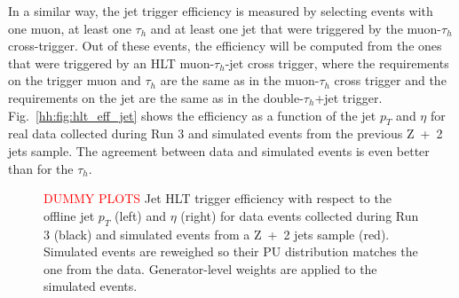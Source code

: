 \documentclass[../main.tex]{subfiles}
\begin{document}
In a similar way, the jet trigger efficiency is measured by selecting events with one muon, at least one $\tau_h$ and at least one jet that were triggered by the muon-$\tau_h$ cross-trigger. Out of these events, the efficiency will be computed from the ones that were triggered by an HLT muon-$\tau_h$-jet cross trigger, where the requirements on the trigger muon and $\tau_h$ are the same as in the muon-$\tau_h$ cross trigger and the requirements on the jet are the same as in the double-$\tau_h$+jet trigger. Fig.~\ref{hh:fig:hlt_eff_jet} shows the efficiency as a function of the jet $p_T$ and $\eta$ for real data collected during Run 3 and simulated events from the previous Z~+~2 jets sample. The agreement between data and simulated events is even better than for the $\tau_h$.

\begin{figure}[h!]
\begin{center}
\end{center}
\caption{\textcolor{red}{DUMMY PLOTS} Jet HLT trigger efficiency with respect to the offline jet $p_T$ (left) and $\eta$ (right) for data events collected during Run 3 (black) and simulated events from a Z~+~2 jets sample (red). Simulated events are reweighed so their PU distribution matches the one from the data. Generator-level weights are applied to the simulated events.}
\label{hh:fig:hlt_eff_tau}
\end{figure}


%
%
\end{document}
